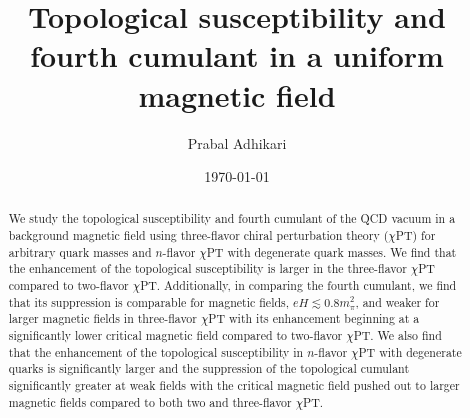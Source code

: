 \documentclass[12pt]{elsarticle}
\begin{document}
\begin{frontmatter}
\title{Topological susceptibility and fourth cumulant in a uniform magnetic field }
\author{Prabal Adhikari}
\address{Physics Department, Faculty of Natural Sciences and Mathematics, St. Olaf College, 1520 St. Olaf Avenue, Northfield, MN 55057, United States}
\date{\today}
\begin{abstract}
We study the topological susceptibility and fourth cumulant of the QCD vacuum in a background magnetic field using three-flavor chiral perturbation theory ($\chi$PT) for arbitrary quark masses and $n$-flavor $\chi$PT with degenerate quark masses. We find that the enhancement of the topological susceptibility is larger in the three-flavor $\chi$PT compared to two-flavor $\chi$PT. Additionally, in comparing the fourth cumulant, we find that its suppression is comparable for magnetic fields, $eH\lesssim 0.8m_{\pi}^{2}$, and weaker for larger magnetic fields in three-flavor $\chi$PT with its enhancement beginning at a significantly lower critical magnetic field compared to two-flavor $\chi$PT. We also find that the enhancement of the topological susceptibility in $n$-flavor $\chi$PT with degenerate quarks is significantly larger and the suppression of the topological cumulant significantly greater at weak fields with the critical magnetic field pushed out to larger magnetic fields compared to both two and three-flavor $\chi$PT.
\end{abstract}
\end{frontmatter}
\end{document}
